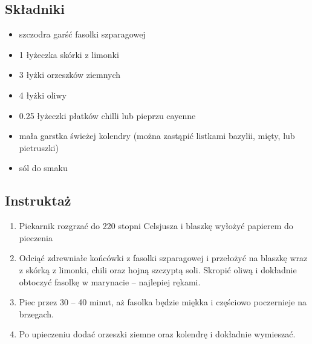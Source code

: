\documentclass[a4paper,10pt]{book}
\begin{document}
\begin{multicols}{2}

\subsection*{Składniki}
\begin{itemize}
    \item szczodra garść fasolki szparagowej
    \item 1 łyżeczka skórki z limonki
    \item 3 łyżki orzeszków ziemnych
    \item 4 łyżki oliwy 
    \item 0.25 łyżeczki płatków chilli lub pieprzu cayenne
    \item mała garstka świeżej kolendry (można zastąpić listkami bazylii, mięty, lub pietruszki)
    \item sól do smaku
\end{itemize}

\columnbreak

\begin{figure}[H]
    \centering
\end{figure}
\end{multicols}

\vspace{0.5cm} 

\subsection*{Instruktaż}
\begin{enumerate}
    \item Piekarnik rozgrzać do 220 stopni Celsjusza i blaszkę wyłożyć papierem do pieczenia
    \item Odciąć zdrewniałe końcówki z fasolki szparagowej i przełożyć na blaszkę wraz z skórką z limonki, chili oraz hojną szczyptą soli. Skropić oliwą i dokładnie obtoczyć fasolkę w marynacie – najlepiej rękami.
    \item Piec przez 30 – 40 minut, aż fasolka będzie miękka i częściowo poczernieje na brzegach.
    \item Po upieczeniu dodać orzeszki ziemne oraz kolendrę i dokładnie wymieszać. 
\end{enumerate}
\end{document}

